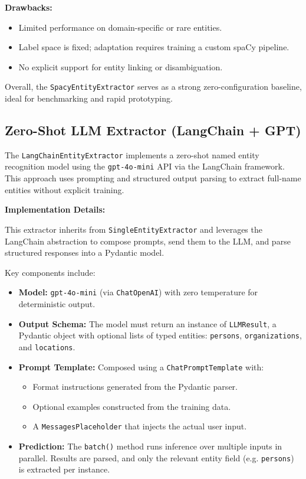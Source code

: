 \textbf{Drawbacks:}
\begin{itemize}
  \item Limited performance on domain-specific or rare entities.
  \item Label space is fixed; adaptation requires training a custom spaCy pipeline.
  \item No explicit support for entity linking or disambiguation.
\end{itemize}

Overall, the \texttt{SpacyEntityExtractor} serves as a strong zero-configuration baseline, ideal for benchmarking and rapid prototyping.


\subsection{Zero-Shot LLM Extractor (LangChain + GPT)}

The \texttt{LangChainEntityExtractor} implements a zero-shot named entity recognition model using the \texttt{gpt-4o-mini} API via the LangChain framework. This approach uses prompting and structured output parsing to extract full-name entities without explicit training.

\textbf{Implementation Details:}

This extractor inherits from \texttt{SingleEntityExtractor} and leverages the LangChain abstraction to compose prompts, send them to the LLM, and parse structured responses into a Pydantic model.

Key components include:

\begin{itemize}
  \item \textbf{Model:} \texttt{gpt-4o-mini} (via \texttt{ChatOpenAI}) with zero temperature for deterministic output.
  \item \textbf{Output Schema:} The model must return an instance of \texttt{LLMResult}, a Pydantic object with optional lists of typed entities: \texttt{persons}, \texttt{organizations}, and \texttt{locations}.
  \item \textbf{Prompt Template:} Composed using a \texttt{ChatPromptTemplate} with:
    \begin{itemize}
      \item Format instructions generated from the Pydantic parser.
      \item Optional examples constructed from the training data.
      \item A \texttt{MessagesPlaceholder} that injects the actual user input.
    \end{itemize}
  \item \textbf{Prediction:} The \texttt{batch()} method runs inference over multiple inputs in parallel. Results are parsed, and only the relevant entity field (e.g. \texttt{persons}) is extracted per instance.
\end{itemize}

